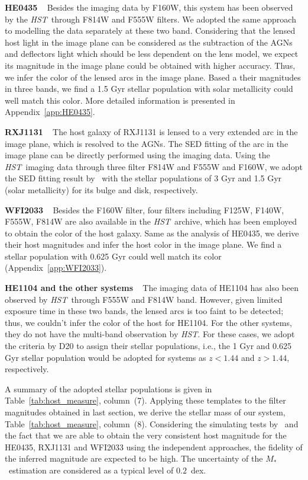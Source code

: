 \documentclass[fleqn,usenatbib]{mnras}
\newcommand{\hst}{{\it HST}}
\newcommand{\mstar}{{$M_*$}}
\begin{document}
{\bf HE0435} ~ Besides the imaging data by F160W, this system has been observed by the \hst\ through F814W and F555W filters. We adopted the same approach to modelling the data separately at these two band. Considering that the lensed host light in the image plane can be considered as the subtraction of the AGNs and deflectors light which should be less dependent on the lens model, we expect its magnitude in the image plane could be obtained with higher accuracy. Thus, we infer the color of the lensed arcs in the image plane. Based a their magnitudes in three bands, we find a 1.5 Gyr stellar population with solar metallicity could well match this color. More detailed information is presented in Appendix~\ref{app:HE0435}.

{\bf RXJ1131} ~ The host galaxy of RXJ1131 is lensed to a very extended arc in the image plane, which is resolved to the AGNs. The SED fitting of the arc in the image plane can be directly performed using the imaging data. Using the \hst\ imaging data through three filter F814W and F555W and F160W, we adopt the SED fitting result by~\citet{Ding2017b} with the stellar populations of 3 Gyr and 1.5 Gyr (solar metallicity) for its bulge and disk, respectively.

{\bf WFI2033} ~ Besides the F160W filter, four filters including F125W, F140W, F555W, F814W are also available in the \hst\ archive, which has been employed to obtain the color of the host galaxy. Same as the analysis of HE0435, we derive their host magnitudes and infer the host color in the image plane. We find a stellar population with 0.625 Gyr could well match its color (Appendix~\ref{app:WFI2033}).

{\bf HE1104 and the other systems} ~ The imaging data of HE1104 has also been observed by \hst\ through F555W and F814W band. However, given limited exposure time in these two bands, the lensed arcs is too faint to be detected; thus, we couldn't infer the color of the host for HE1104. For the other systems, they do not have the multi-band observation by \hst. For these cases, we adopt the criteria by D20 to assign their stellar populations, i.e., the 1 Gyr and 0.625 Gyr stellar population would be adopted for systems as $z<1.44$ and $z>1.44$, respectively.

A summary of the adopted stellar populations is given in Table~\ref{tab:host_measure}, column~(7). Applying these templates to the filter magnitudes obtained in last section, we derive the stellar mass of our system, Table~\ref{tab:host_measure}, column~(8). Considering the simulating tests by~\citet{Ding2017a} and the fact that we are able to obtain the very consistent host magnitude for the HE0435, RXJ1131 and WFI2033 using the independent approaches, the fidelity of the inferred magnitude are expected to be high. The uncertainty of the \mstar\ estimation are considered as a typical level of $0.2$~dex.
\end{document}
